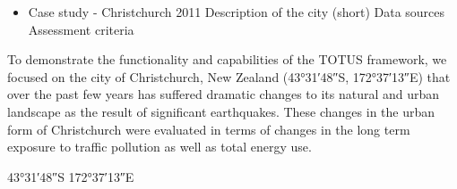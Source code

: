 \begin{itemize} 
	\item Case study - Christchurch 2011
	\subitem Description of the city (short)
	\subitem Data sources
	\subitem Assessment criteria
\end{itemize}
To demonstrate the functionality and capabilities of the TOTUS framework, we focused on the city of Christchurch, New Zealand (43°31′48″S, 172°37′13″E) that over the past few years has suffered dramatic changes to its natural and urban landscape as the result of significant earthquakes. These changes in the urban form of Christchurch were evaluated in terms of changes in the long term exposure to traffic pollution as well as total energy use.


43°31′48″S 172°37′13″E